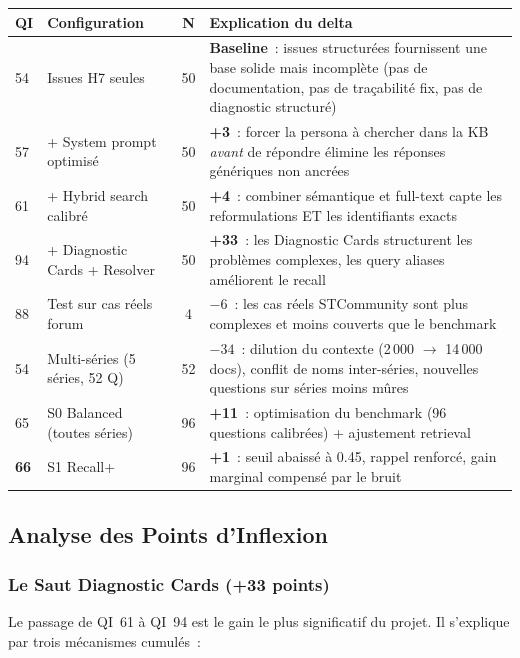 \begin{longtable}{p{0.8cm}p{3.5cm}cp{6cm}}
\toprule
\textbf{QI} & \textbf{Configuration} & \textbf{N} & \textbf{Explication du delta} \\
\midrule
54 & Issues H7 seules & 50 & \textbf{Baseline}~: issues structurées fournissent une base solide mais incomplète (pas de documentation, pas de traçabilité fix, pas de diagnostic structuré) \\
57 & + System prompt optimisé & 50 & \textbf{+3}~: forcer la persona à chercher dans la KB \textit{avant} de répondre élimine les réponses génériques non ancrées \\
61 & + Hybrid search calibré & 50 & \textbf{+4}~: combiner sémantique et full-text capte les reformulations ET les identifiants exacts \\
94 & + Diagnostic Cards + Resolver & 50 & \textbf{+33}~: les Diagnostic Cards structurent les problèmes complexes, les query aliases améliorent le recall \\
88 & Test sur cas réels forum & 4 & \textbf{$-6$}~: les cas réels STCommunity sont plus complexes et moins couverts que le benchmark \\
54 & Multi-séries (5 séries, 52 Q) & 52 & \textbf{$-34$}~: dilution du contexte (2\,000 $\to$ 14\,000 docs), conflit de noms inter-séries, nouvelles questions sur séries moins mûres \\
65 & S0 Balanced (toutes séries) & 96 & \textbf{+11}~: optimisation du benchmark (96 questions calibrées) + ajustement retrieval \\
\textbf{66} & S1 Recall+ & 96 & \textbf{+1}~: seuil abaissé à 0.45, rappel renforcé, gain marginal compensé par le bruit \\
\bottomrule
\end{longtable}

\subsection{Analyse des Points d'Inflexion}
\label{sec:points_inflexion}

\subsubsection{Le Saut Diagnostic Cards (+33 points)}

Le passage de QI~61 à QI~94 est le gain le plus significatif du projet. Il s'explique par trois mécanismes cumulés~:


